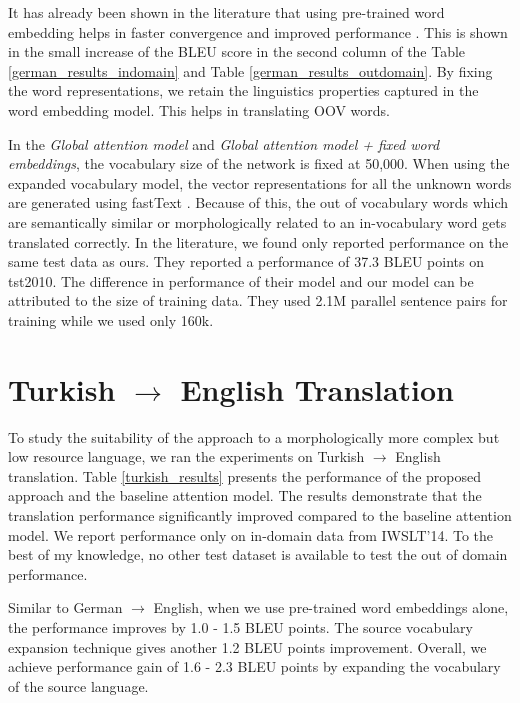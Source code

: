 It has already been shown in the literature that using pre-trained word embedding helps in faster convergence and improved performance \citep{garcia2015document,delbrouck2017visually}. This is shown in the small increase of the BLEU score in the second column of the Table \ref{german_results_indomain} and Table \ref{german_results_outdomain}. By fixing the word representations, we retain the linguistics properties captured in the word embedding model. This helps in translating OOV words.

In the \textit{Global attention model} and \textit{Global attention model + fixed word embeddings}, the vocabulary size of the network is fixed at 50,000. When using the expanded vocabulary model, the vector representations for all the unknown words are generated using fastText \citep{bojanowski2016enriching}. Because of this, the out of vocabulary words which are semantically similar or morphologically related to an in-vocabulary word gets translated correctly. In the literature, we found only \cite{bahar2017rwth} reported performance on the same test data as ours. They reported a performance of 37.3 BLEU points on tst2010. The difference in performance of their model and our model can be attributed to the size of training data. They used 2.1M parallel sentence pairs for training while we used only 160k.





\section{Turkish $\rightarrow$ English Translation}
\label{sec:tr_en}
To study the suitability of the approach to a morphologically more complex but low resource language, we ran the experiments on Turkish $\rightarrow$ English translation. Table \ref{turkish_results} presents the performance of the proposed approach and the baseline attention model. The results demonstrate that the translation performance significantly improved compared to the baseline attention model. We report performance only on in-domain data from IWSLT'14. To the best of my knowledge, no other test dataset is available to test the out of domain performance.

Similar to German $\rightarrow$ English, when we use pre-trained word embeddings alone, the performance improves by 1.0 - 1.5 BLEU points. The source vocabulary expansion technique gives another 1.2 BLEU points improvement. Overall, we achieve performance gain of 1.6 - 2.3 BLEU points by expanding the vocabulary of the source language.

